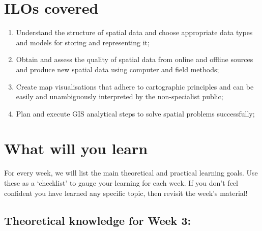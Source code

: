 \documentclass[
  letterpaper,
  DIV=11,
  numbers=noendperiod]{scrreprt}
\begin{document}
\section*{ILOs covered}\label{ilos-covered-2}


\begin{enumerate}
\def\labelenumi{\arabic{enumi}.}
\item
  Understand the structure of spatial data and choose appropriate data
  types and models for storing and representing it;
\item
  Obtain and assess the quality of spatial data from online and offline
  sources and produce new spatial data using computer and field methods;
\item
  Create map visualisations that adhere to cartographic principles and
  can be easily and unambiguously interpreted by the non-specialist
  public;
\item
  Plan and execute GIS analytical steps to solve spatial problems
  successfully;
\end{enumerate}

\section*{What will you learn}\label{what-will-you-learn-2}


For every week, we will list the main theoretical and practical learning
goals. Use these as a `checklist' to gauge your learning for each week.
If you don't feel confident you have learned any specific topic, then
revisit the week's material!

\subsection*{Theoretical knowledge for Week
3:}\label{theoretical-knowledge-for-week-3}
\end{document}
